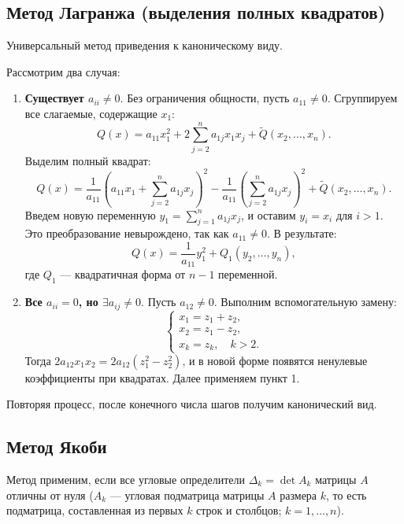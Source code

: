 \documentclass[12pt]{article}
\begin{document}
\subsection{Метод Лагранжа (выделения полных квадратов)}
Универсальный метод приведения к каноническому виду.

\begin{stat}
Рассмотрим два случая:
\begin{enumerate}
    \item \textbf{Существует $a_{ii} \neq 0$}. Без ограничения общности, пусть $a_{11} \neq 0$. Сгруппируем все слагаемые, содержащие $x_1$:
    \[
    Q(x) = a_{11}x_1^2 + 2\sum_{j=2}^n a_{1j}x_1x_j + \tilde{Q}(x_2,\dots,x_n).
    \]
    Выделим полный квадрат:
    \[
    Q(x) = \frac{1}{a_{11}}\left( a_{11}x_1 + \sum_{j=2}^n a_{1j}x_j \right)^2 - \frac{1}{a_{11}} \left( \sum_{j=2}^n a_{1j}x_j \right)^2 + \tilde{Q}(x_2,\dots,x_n).
    \]
    Введем новую переменную $y_1 = \sum_{j=1}^n a_{1j}x_j$, и оставим $y_i = x_i$ для $i>1$. Это преобразование невырождено, так как $a_{11} \neq 0$. В результате:
    \[
    Q(x) = \frac{1}{a_{11}} y_1^2 + Q_1(y_2,\dots,y_n),
    \]
    где $Q_1$ --- квадратичная форма от $n-1$ переменной.
    \item \textbf{Все $a_{ii}=0$, но $\exists a_{ij}\neq0$}. Пусть $a_{12}\neq0$. Выполним вспомогательную замену:
    \[
    \begin{cases}
    x_1 = z_1 + z_2, \\
    x_2 = z_1 - z_2, \\
    x_k = z_k, \quad k>2.
    \end{cases}
    \]
    Тогда $2a_{12}x_1x_2 = 2a_{12}(z_1^2 - z_2^2)$, и в новой форме появятся ненулевые коэффициенты при квадратах. Далее применяем пункт 1.
\end{enumerate}
Повторяя процесс, после конечного числа шагов получим канонический вид.
\end{stat}

\subsection{Метод Якоби}
Метод применим, если все угловые определители $\Delta_k = \det A_k$ матрицы $A$ отличны от нуля ($A_k$ --- угловая подматрица матрицы $A$ размера $k$, то есть подматрица, составленная из первых $k$ строк и столбцов; $k = 1, \dots, n$).
\end{document}
